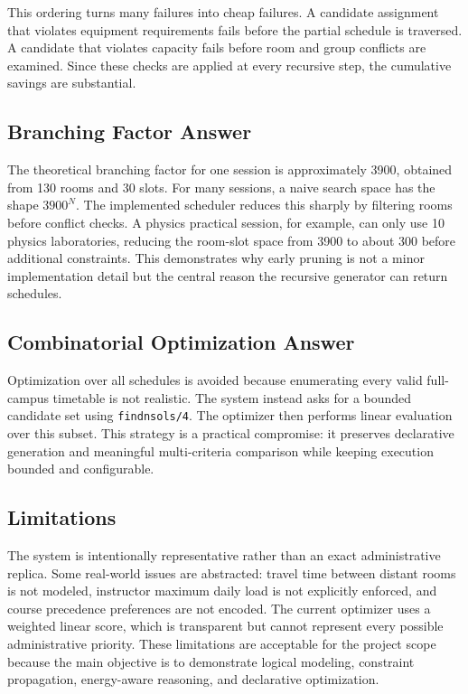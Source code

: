 \documentclass[12pt,a4paper]{article}
\newcommand{\predicate}[1]{\texttt{#1}}
\begin{document}
This ordering turns many failures into cheap failures. A candidate assignment that violates equipment requirements fails before the partial schedule is traversed. A candidate that violates capacity fails before room and group conflicts are examined. Since these checks are applied at every recursive step, the cumulative savings are substantial.

\subsection{Branching Factor Answer}

The theoretical branching factor for one session is approximately 3900, obtained from 130 rooms and 30 slots. For many sessions, a naive search space has the shape \(3900^N\). The implemented scheduler reduces this sharply by filtering rooms before conflict checks. A physics practical session, for example, can only use 10 physics laboratories, reducing the room-slot space from 3900 to about 300 before additional constraints. This demonstrates why early pruning is not a minor implementation detail but the central reason the recursive generator can return schedules.

\subsection{Combinatorial Optimization Answer}

Optimization over all schedules is avoided because enumerating every valid full-campus timetable is not realistic. The system instead asks for a bounded candidate set using \predicate{findnsols/4}. The optimizer then performs linear evaluation over this subset. This strategy is a practical compromise: it preserves declarative generation and meaningful multi-criteria comparison while keeping execution bounded and configurable.

\subsection{Limitations}

The system is intentionally representative rather than an exact administrative replica. Some real-world issues are abstracted: travel time between distant rooms is not modeled, instructor maximum daily load is not explicitly enforced, and course precedence preferences are not encoded. The current optimizer uses a weighted linear score, which is transparent but cannot represent every possible administrative priority. These limitations are acceptable for the project scope because the main objective is to demonstrate logical modeling, constraint propagation, energy-aware reasoning, and declarative optimization.
\end{document}
